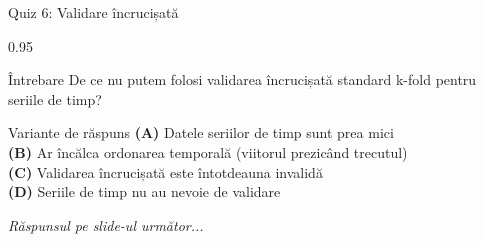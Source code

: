\documentclass[9pt, aspectratio=169, t]{beamer}
\begin{document}
\begin{frame}{Quiz 6: Validare încrucișată}
    \begin{cminipage}{0.95\textwidth}
    \begin{alertblock}{Întrebare}
        De ce nu putem folosi validarea încrucișată standard k-fold pentru seriile de timp?
    \end{alertblock}

    \vspace{0.4cm}

    \begin{block}{Variante de răspuns}
        \textcolor{MainBlue}{\textbf{(A)}} Datele seriilor de timp sunt prea mici\\[3pt]
        \textcolor{MainBlue}{\textbf{(B)}} Ar încălca ordonarea temporală (viitorul prezicând trecutul)\\[3pt]
        \textcolor{MainBlue}{\textbf{(C)}} Validarea încrucișată este întotdeauna invalidă\\[3pt]
        \textcolor{MainBlue}{\textbf{(D)}} Seriile de timp nu au nevoie de validare
    \end{block}

    \vspace{0.5cm}

    \begin{center}
        \textit{Răspunsul pe slide-ul următor...}
    \end{center}
    \end{cminipage}
\end{frame}
\end{document}
